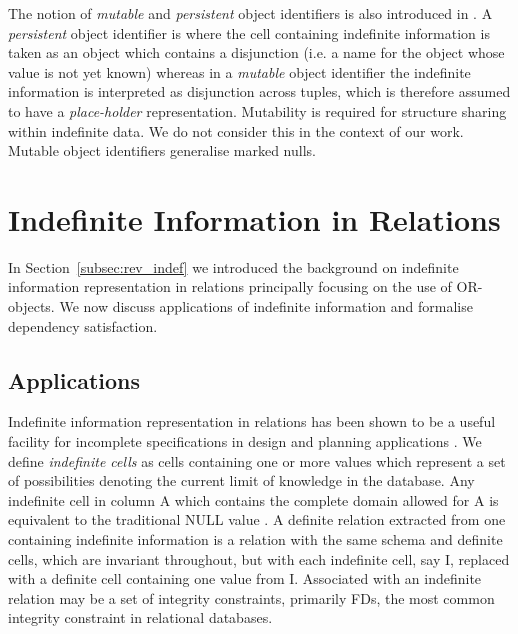 \medskip

The notion of {\em mutable} and {\em persistent} object identifiers is
also introduced in \cite{inv91}. A {\em persistent} object identifier is where the cell
containing indefinite information is taken as an object which contains a
disjunction (i.e. a name for the object whose value is not yet known)
 whereas in a {\em mutable} object identifier the indefinite
information is interpreted as disjunction across tuples, which
is therefore assumed to have a {\em place-holder} representation.
Mutability is required for structure sharing within indefinite data.
We do not consider this in the context of our work. Mutable object
identifiers generalise marked nulls. 


\section{Indefinite Information in Relations}\label{sec:intro}

In Section~\ref{subsec:rev_indef} we introduced the background on
indefinite information representation in relations principally
focusing on the use of OR-objects. We now discuss applications of
indefinite information and formalise dependency satisfaction.

\subsection{Applications}
		
Indefinite information representation in relations has been shown to be 
a useful facility for incomplete specifications in design and planning
applications \cite{inv91,ivv95,vn95}. We define {\em indefinite cells} as cells
containing one or more values which represent a set of possibilities denoting
 the current limit of knowledge in the database. Any indefinite cell in 
column A which contains the complete domain allowed for A is equivalent to
the traditional NULL value \cite{lip79}.
 A definite relation extracted from
one containing indefinite information is a relation with the same schema
and definite cells, which are invariant throughout, but with each indefinite
cell, say I, replaced with a definite cell containing one value from I.  
Associated with an indefinite
relation may be a set of integrity constraints, primarily FDs, the
most common integrity constraint in relational databases. 
\medskip


